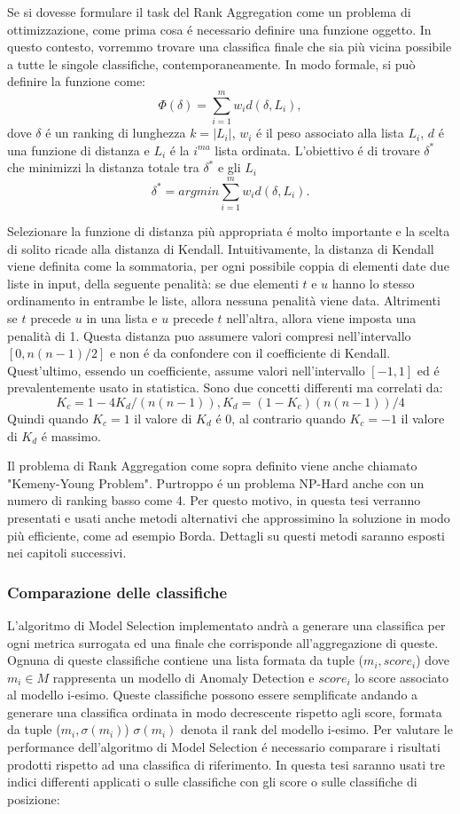 Se si dovesse formulare il task del Rank Aggregation come un problema di ottimizzazione, come prima cosa é necessario definire una funzione oggetto. In questo contesto, vorremmo trovare una classifica finale che sia più vicina possibile a tutte le singole classifiche, contemporaneamente. In modo formale, si può definire la funzione come: \[ \Phi(\delta) = \sum_{i=1}^{m} w_id(\delta,L_i), \]	
dove $\delta$ é un ranking di lunghezza $k=|L_i|$, $w_i$ é il peso associato alla lista $L_i$, $d$ é una funzione di distanza e $L_i$ é la $i^{ma}$ lista ordinata.
L'obiettivo é di trovare $\delta^*$ che minimizzi la distanza totale tra $\delta^*$ e gli $L_i$
\[ \delta^* = arg min \sum_{i=1}^{m} w_id(\delta,L_i). \]

Selezionare la funzione di distanza più appropriata é molto importante e la scelta di solito ricade alla distanza di Kendall.
Intuitivamente, la distanza di Kendall viene definita come la sommatoria, per ogni possibile coppia di elementi date due liste in input, della seguente penalità: se due elementi $t$ e $u$ hanno lo stesso ordinamento in entrambe le liste, allora nessuna penalità viene data. Altrimenti se $t$ precede $u$ in una lista e $u$ precede $t$ nell'altra, allora viene imposta una penalità di 1.
Questa distanza puo assumere valori compresi nell'intervallo $[0,n(n-1)/2]$ e non é da confondere con il coefficiente di Kendall. Quest'ultimo, essendo un coefficiente, assume valori nell'intervallo $[-1,1]$ ed é prevalentemente usato in statistica. Sono due concetti differenti ma correlati da:
\[K_c=1-4K_d/(n(n-1)), K_d = (1-K_c)(n(n-1))/4\]
Quindi quando $K_c=1$ il valore di $K_d$ é 0, al contrario quando $K_c=-1$ il valore di $K_d$ é massimo.

Il problema di Rank Aggregation come sopra definito viene anche chiamato "Kemeny-Young Problem". Purtroppo é un problema NP-Hard anche con un numero di ranking basso come 4. Per questo motivo, in questa tesi verranno presentati e usati anche metodi alternativi che approssimino la soluzione in modo più efficiente, come ad esempio Borda. Dettagli su questi metodi saranno esposti nei capitoli successivi.

\subsubsection{Comparazione delle classifiche}
L'algoritmo di Model Selection implementato andrà a generare una classifica per ogni metrica surrogata ed una finale che corrisponde all'aggregazione di queste. Ognuna di queste classifiche contiene una lista formata da tuple (\(m_i, score_i\)) dove $m_i \in M $ rappresenta un modello di Anomaly Detection e $score_i$ lo score associato al modello i-esimo.
Queste classifiche possono essere semplificate andando a generare una classifica ordinata in modo decrescente rispetto agli score, formata da tuple (\(m_i, \sigma(m_i)\)) $\sigma(m_i)$ denota il rank del modello i-esimo.
Per valutare le performance dell'algoritmo di Model Selection é necessario comparare i risultati prodotti rispetto ad una classifica di riferimento.
In questa tesi saranno usati tre indici differenti applicati o sulle classifiche con gli score o sulle classifiche di posizione:

